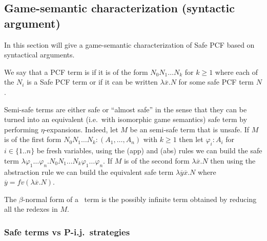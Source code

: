 \subsection{Game-semantic characterization (syntactic argument)}

In this section will give a game-semantic characterization of Safe
PCF based on syntactical arguments.

\begin{definition}
We say that a PCF term is  if it is of the form
$N_0 N_1 \ldots N_k$ for $k\geq 1$ where each of the $N_i$ is a Safe
PCF term or if it can be written $\lambda \overline{x} . N$ for some
safe PCF term $N$.
\end{definition}
Semi-safe terms are either safe or ``almost safe'' in the sense that
they can be turned into an equivalent (i.e.~with isomorphic game
semantics) safe term  by performing $\eta$-expansions. Indeed, let
$M$ be an semi-safe term that is unsafe. If $M$ is of the first form
$N_0 N_1 \ldots N_k : (A_1,\ldots,A_n)$ with $k\geq 1$ then let
$\varphi_i:A_i$ for $i\in\{1..n\}$ be fresh variables, using the
(app) and (abs) rules we can build the safe term $\lambda \varphi_1
\ldots \varphi_n . N_0 N_1 \ldots N_k \varphi_1 \ldots \varphi_n$.
If $M$ is of the second form $\lambda \overline{x} . N$ then using
the abstraction rule we can build the equivalent safe term $\lambda
\overline{y} \overline{x}. N$  where $\overline{y} = fv(\lambda
\overline{x}. N)$.

The $\beta$-normal form of a \pcf\ term is the possibly infinite
term obtained by reducing all the redexes in $M$.

\subsubsection{Safe terms vs P-i.j.\ strategies}

